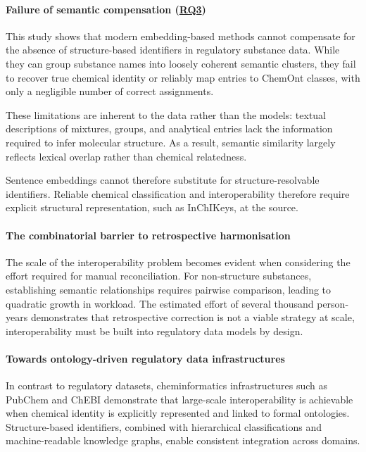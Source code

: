 \paragraph{Failure of semantic compensation (\texorpdfstring{\hyperref[sec:question3]{RQ3}}{RQ3})}

This study shows that modern embedding-based methods cannot compensate for the absence of structure-based identifiers in regulatory substance data. While they can group substance names into loosely coherent semantic clusters, they fail to recover true chemical identity or reliably map entries to ChemOnt classes, with only a negligible number of correct assignments.

These limitations are inherent to the data rather than the models: textual descriptions of mixtures, groups, and analytical entries lack the information required to infer molecular structure. As a result, semantic similarity largely reflects lexical overlap rather than chemical relatedness.

Sentence embeddings cannot therefore substitute for structure-resolvable identifiers. Reliable chemical classification and interoperability therefore require explicit structural representation, such as InChIKeys, at the source.

\paragraph{The combinatorial barrier to retrospective harmonisation}

The scale of the interoperability problem becomes evident when considering the effort required for manual reconciliation. For non-structure substances, establishing semantic relationships requires pairwise comparison, leading to quadratic growth in workload. The estimated effort of several thousand person-years demonstrates that retrospective correction is not a viable strategy at scale, interoperability must be built into regulatory data models by design.

\paragraph{Towards ontology-driven regulatory data infrastructures}

In contrast to regulatory datasets, cheminformatics infrastructures such as PubChem and ChEBI demonstrate that large-scale interoperability is achievable when chemical identity is explicitly represented and linked to formal ontologies. Structure-based identifiers, combined with hierarchical classifications and machine-readable knowledge graphs, enable consistent integration across domains.

